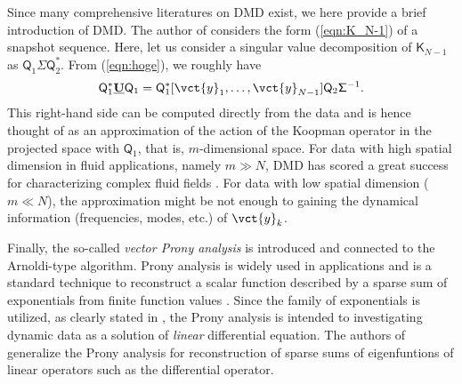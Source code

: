 \documentclass[a4paper,10pt]{article}
\begin{document}
%
Since many comprehensive literatures on DMD exist, we here provide a brief introduction of DMD.  
The author of \cite{Schmid_JFM656} considers the form (\ref{eqn:K_N-1}) of a snapshot sequence.  
Here, let us consider a singular value decomposition of $\mathsf{K}_{N-1}$ as $\mathsf{Q}_1\mathsf{\Sigma}\mathsf{Q}_2^\ast$.  
From (\ref{eqn:hoge}), we roughly have
\[
\mathsf{Q}_1^\ast\mathbf{\underline{U}}\mathsf{Q}_1
=\mathsf{Q}_1^\ast[\vct{y}_1,\ldots,\vct{y}_{N-1}]\mathsf{Q}_2\mathsf{\Sigma}^{-1}.
\]
This right-hand side can be computed directly from the data and is hence thought of as an approximation of the action of the Koopman operator in the projected space with $\mathsf{Q}_1$, that is, $m$-dimensional space.  
For data with high spatial dimension in fluid applications, namely $m\gg N$, DMD has scored a great success for characterizing complex fluid fields \cite{Schmid_JFM656,Chen_JNLS22,Tu_JCD1}.  
For data with low spatial dimension ($m\ll N$), the approximation might be not enough to gaining the dynamical information (frequencies, modes, etc.) of $\vct{y}_k$. 

%
\vspace*{2mm}

Finally, the so-called \emph{vector Prony analysis} \cite{Susuki_CDC15} is introduced and connected to the Arnoldi-type algorithm.  
Prony analysis is widely used in applications and is a standard technique to reconstruct a scalar function described by a sparse sum of exponentials from finite function values \cite{Hildebrand:1956,Hauer_IEEETPS5,Plonka:2014,Nabavi_ACC14}.  
Since the family of exponentials is utilized, as clearly stated in \cite{Hauer_IEEETPS5}, the Prony analysis is intended to investigating dynamic data as a solution of \emph{linear} differential equation.  
The authors of \cite{Peter_IP29} generalize the Prony analysis for reconstruction of sparse sums of eigenfuntions of linear operators such as the differential operator.  
\end{document}
